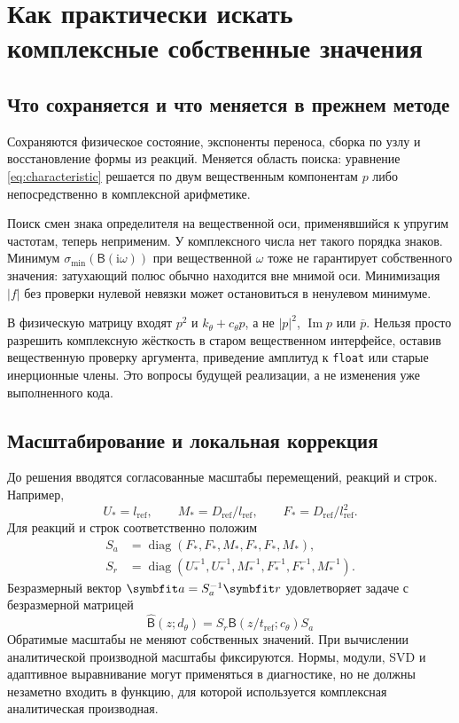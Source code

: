 \documentclass[11pt,a4paper]{article}
\numberwithin{equation}{section}
\newcommand{\ii}{\mathrm i}
\newcommand{\kth}{k_\theta}
\newcommand{\cth}{c_\theta}
\newcommand{\BB}{\mathsf B}
\newcommand{\refsub}{\mathrm{ref}}
\newcommand{\tref}{t_{\refsub}}
\newcommand{\lref}{l_{\refsub}}
\newcommand{\Dref}{D_{\refsub}}
\DeclareMathOperator{\diag}{diag}
\begin{document}
\section{Как практически искать комплексные собственные значения}
\label{sec:numerics}

\subsection{Что сохраняется и что меняется в прежнем методе}

Сохраняются физическое состояние, экспоненты переноса, сборка по узлу
и восстановление формы из реакций. Меняется область поиска: уравнение
\eqref{eq:characteristic} решается по двум вещественным компонентам $p$
либо непосредственно в комплексной арифметике.

Поиск смен знака определителя на вещественной оси, применявшийся к
упругим частотам, теперь неприменим. У комплексного числа нет такого
порядка знаков. Минимум $\sigma_{\min}(\BB(\ii\omega))$ при вещественной
$\omega$ тоже не гарантирует собственного значения: затухающий полюс
обычно находится вне мнимой оси. Минимизация $|f|$ без проверки нулевой
невязки может остановиться в ненулевом минимуме.

В физическую матрицу входят $p^2$ и $\kth+\cth p$, а не $|p|^2$,
$\operatorname{Im}p$ или $\overline p$. Нельзя просто разрешить комплексную
жёсткость в старом вещественном интерфейсе, оставив вещественную проверку
аргумента, приведение амплитуд к \texttt{float} или старые инерционные члены.
Это вопросы будущей реализации, а не изменения уже выполненного кода.

\subsection{Масштабирование и локальная коррекция}

До решения вводятся согласованные масштабы перемещений, реакций и строк.
Например,
\[
 U_*=\lref,\qquad M_*=\Dref/\lref,\qquad F_*=\Dref/\lref^2.
\]
Для реакций и строк соответственно положим
\begin{align*}
S_a&=\diag(F_*,F_*,M_*,F_*,F_*,M_*),\\
S_r&=\diag(U_*^{-1},U_*^{-1},M_*^{-1},F_*^{-1},F_*^{-1},M_*^{-1}).
\end{align*}
Безразмерный вектор $\symbfit a=S_a^{-1}\symbfit r$
удовлетворяет задаче с безразмерной матрицей
\begin{equation}
 \widehat{\BB}(z;d_\theta)=S_r\BB(z/\tref;\cth)S_a
 \label{eq:scaledB}
\end{equation}
Обратимые масштабы не меняют собственных значений.
При вычислении аналитической производной масштабы фиксируются.
Нормы, модули, SVD и адаптивное выравнивание могут применяться в
диагностике, но не должны незаметно входить в функцию, для которой
используется комплексная аналитическая производная.
\end{document}
